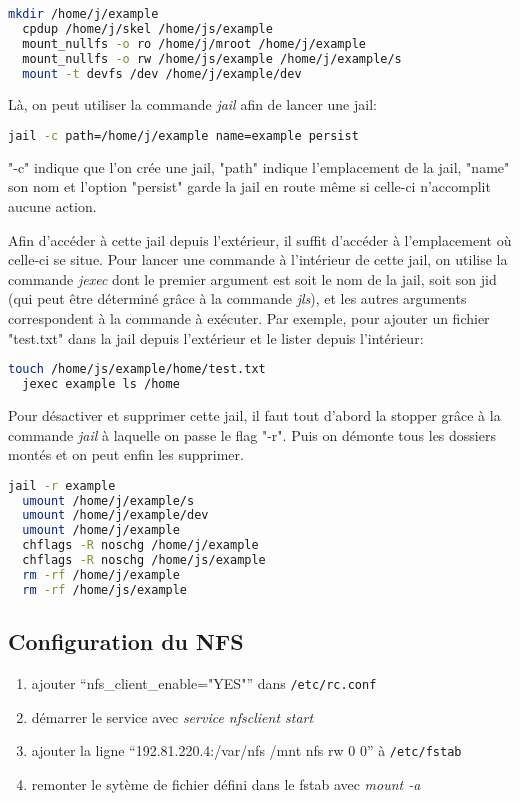 \documentclass[10pt,a4paper]{article}
\begin{document}
\begin{lstlisting}[language=bash]
  mkdir /home/j/example
  cpdup /home/j/skel /home/js/example
  mount_nullfs -o ro /home/j/mroot /home/j/example
  mount_nullfs -o rw /home/js/example /home/j/example/s
  mount -t devfs /dev /home/j/example/dev
\end{lstlisting}
Là, on peut utiliser la commande \emph{jail} afin de lancer une jail:
\begin{lstlisting}[language=bash]
  jail -c path=/home/j/example name=example persist
\end{lstlisting}
"-c" indique que l'on crée une jail, "path" indique l'emplacement de la jail,
"name" son nom et l'option "persist" garde la jail en route même si celle-ci n'accomplit aucune action.

Afin d'accéder à cette jail depuis l'extérieur, il suffit d'accéder à l'emplacement où celle-ci se situe.
Pour lancer une commande à l'intérieur de cette jail,
on utilise la commande \emph{jexec} dont le premier argument est soit le nom de la jail,
soit son jid (qui peut être déterminé grâce à la commande \emph{jls}),
et les autres arguments correspondent à la commande à exécuter.
Par exemple, pour ajouter un fichier "test.txt" dans la jail depuis l'extérieur et le lister depuis l'intérieur:
\begin{lstlisting}[language=bash]
  touch /home/js/example/home/test.txt
  jexec example ls /home
\end{lstlisting}

Pour désactiver et supprimer cette jail, il faut tout d'abord la stopper grâce à la commande \emph{jail} à laquelle on passe le flag "-r".
Puis on démonte tous les dossiers montés et on peut enfin les supprimer.
\begin{lstlisting}[language=bash]
  jail -r example
  umount /home/j/example/s
  umount /home/j/example/dev
  umount /home/j/example
  chflags -R noschg /home/j/example
  chflags -R noschg /home/js/example
  rm -rf /home/j/example
  rm -rf /home/js/example
\end{lstlisting}

\subsection{Configuration du NFS}
\begin{enumerate}
  \item ajouter ``nfs\_client\_enable="YES"'' dans \texttt{/etc/rc.conf}
  \item démarrer le service avec \emph{service nfsclient start}
  \item ajouter la ligne ``192.81.220.4:/var/nfs        /mnt        nfs        rw        0        0'' à \texttt{/etc/fstab}
  \item remonter le sytème de fichier défini dans le fstab avec \emph{mount -a}
\end{enumerate}
\end{document}
